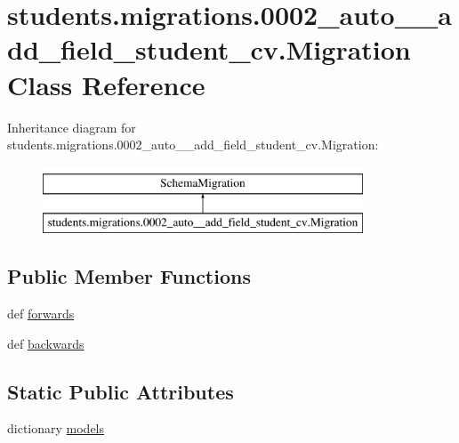 \hypertarget{classstudents_1_1migrations_1_10002__auto____add__field__student__cv_1_1_migration}{\section{students.\-migrations.0002\-\_\-auto\-\_\-\-\_\-add\-\_\-field\-\_\-student\-\_\-cv.Migration Class Reference}
\label{classstudents_1_1migrations_1_10002__auto____add__field__student__cv_1_1_migration}
}
Inheritance diagram for students.\-migrations.0002\-\_\-auto\-\_\-\-\_\-add\-\_\-field\-\_\-student\-\_\-cv.Migration\-:\begin{figure}[H]
\begin{center}
\leavevmode
\includegraphics[height=2.000000cm]{classstudents_1_1migrations_1_10002__auto____add__field__student__cv_1_1_migration}
\end{center}
\end{figure}
\subsection*{Public Member Functions}
\begin{DoxyCompactItemize}
\item 
def \hyperlink{classstudents_1_1migrations_1_10002__auto____add__field__student__cv_1_1_migration_a9a923d2d1ae804311fa0803b468b8f4b}{forwards}
\item 
def \hyperlink{classstudents_1_1migrations_1_10002__auto____add__field__student__cv_1_1_migration_ae492244bf15cb25ccf6aaec16e6629a9}{backwards}
\end{DoxyCompactItemize}
\subsection*{Static Public Attributes}
\begin{DoxyCompactItemize}
\item 
dictionary \hyperlink{classstudents_1_1migrations_1_10002__auto____add__field__student__cv_1_1_migration_a341e15c4f0ea5a07c66d93d02d3fb464}{models}
\end{DoxyCompactItemize}


